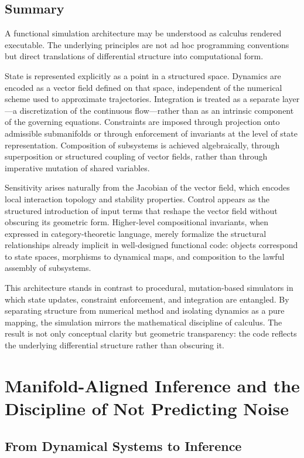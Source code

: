 \documentclass[12pt]{book}
\begin{document}
\section{Summary}

A functional simulation architecture may be understood as calculus rendered
executable. The underlying principles are not ad hoc programming conventions
but direct translations of differential structure into computational form.

State is represented explicitly as a point in a structured space. Dynamics are
encoded as a vector field defined on that space, independent of the numerical
scheme used to approximate trajectories. Integration is treated as a separate
layer---a discretization of the continuous flow---rather than as an intrinsic
component of the governing equations. Constraints are imposed through
projection onto admissible submanifolds or through enforcement of invariants
at the level of state representation. Composition of subsystems is achieved
algebraically, through superposition or structured coupling of vector fields,
rather than through imperative mutation of shared variables.

Sensitivity arises naturally from the Jacobian of the vector field, which
encodes local interaction topology and stability properties. Control appears
as the structured introduction of input terms that reshape the vector field
without obscuring its geometric form. Higher-level compositional invariants,
when expressed in category-theoretic language, merely formalize the structural
relationships already implicit in well-designed functional code: objects
correspond to state spaces, morphisms to dynamical maps, and composition to
the lawful assembly of subsystems.

This architecture stands in contrast to procedural, mutation-based simulators
in which state updates, constraint enforcement, and integration are entangled.
By separating structure from numerical method and isolating dynamics as a
pure mapping, the simulation mirrors the mathematical discipline of calculus.
The result is not only conceptual clarity but geometric transparency: the code
reflects the underlying differential structure rather than obscuring it.

\chapter{Manifold-Aligned Inference and the Discipline of Not Predicting Noise}

\section{From Dynamical Systems to Inference}
\end{document}
